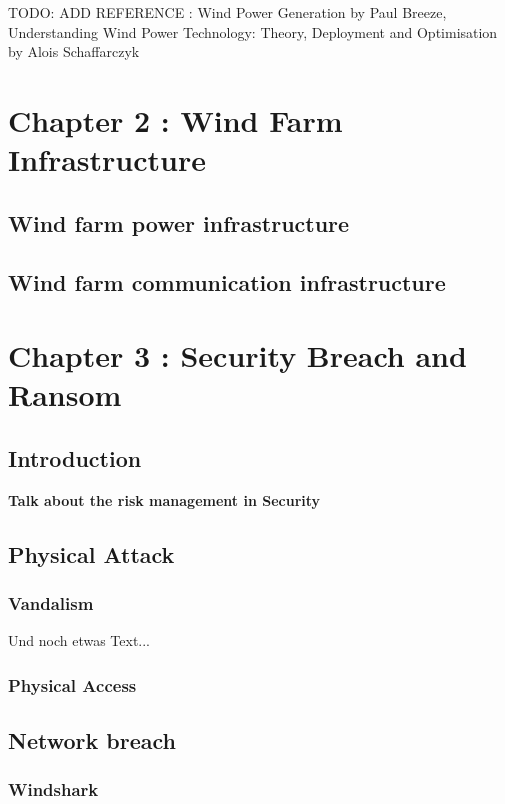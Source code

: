 \documentclass[twosided,a4,10pt]{article}
\begin{document}
\begin{multicols}{2}
\begin{description}
TODO: ADD REFERENCE : Wind Power Generation by Paul Breeze, Understanding Wind Power Technology: Theory, Deployment and Optimisation by Alois Schaffarczyk 
\end{description}

\section{Chapter 2 : Wind Farm Infrastructure }
 \subsection{Wind farm power infrastructure}
 \lipsum[1]
 \subsection{Wind farm communication infrastructure}
 \lipsum[1]
 
 
\section{Chapter 3 : Security Breach and Ransom }

\subsection{Introduction}
 \textbf{Talk about the risk management in Security}
 \lipsum[1]


\subsection{Physical Attack}
 \subsubsection{Vandalism}
 Und noch etwas Text... \cite{muster} \newline
 \lipsum[1]
 \subsubsection{Physical Access}
 \lipsum[1]
 
\subsection{Network breach}
 \subsubsection{Windshark}
 \lipsum[1]

\end{multicols}
\end{document}
